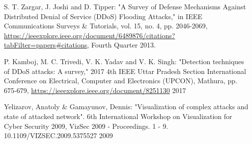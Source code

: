 \begin{thebibliography}{99}

 S. T. Zargar, J. Joshi and D. Tipper: "A Survey of Defense Mechanisms Against Distributed Denial of Service (DDoS) Flooding Attacks," in IEEE Communications Surveys \& Tutorials, vol. 15, no. 4, pp. 2046-2069, \url{https://ieeexplore.ieee.org/document/6489876/citations?tabFilter=papers#citations}, Fourth Quarter 2013.

 P. Kamboj, M. C. Trivedi, V. K. Yadav and V. K. Singh: "Detection techniques of DDoS attacks: A survey," 2017 4th IEEE Uttar Pradesh Section International Conference on Electrical, Computer and Electronics (UPCON), Mathura,  pp. 675-679, \url{https://ieeexplore.ieee.org/document/8251130} 2017

 Yelizarov, Anatoly \& Gamayunov, Dennis: "Visualization of complex attacks and state of attacked network". 6th International Workshop on Visualization for Cyber Security 2009, VizSec 2009 - Proceedings. 1 - 9. 10.1109/VIZSEC.2009.5375527 2009


\end{thebibliography}

